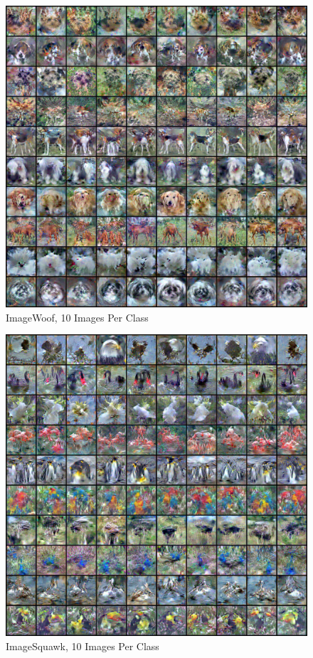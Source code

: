 \begin{figure}
    \centering
    \includegraphics[width=\linewidth]{figures/imagenet_10/imagewoof_all.pdf}
    \caption{ImageWoof, 10 Images Per Class}
    \label{fig:woof_10}
\end{figure}
\begin{figure}
    \centering
    \includegraphics[width=\linewidth]{figures/imagenet_10/imagesquawk_all.pdf}
    \caption{ImageSquawk, 10 Images Per Class}
    \label{fig:squawk_10}
\end{figure}
